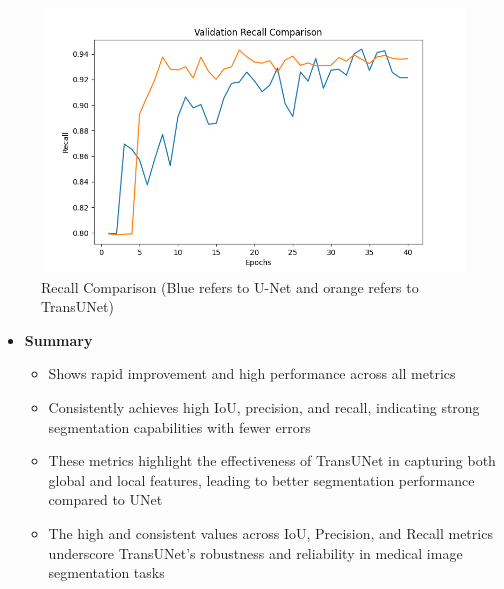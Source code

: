 \documentclass[11pt,a4paper]{article}
\begin{document}
\begin{figure}[H]
    \centering
    \includegraphics[width= 0.9\linewidth]{recall.png}
    \caption{Recall Comparison (Blue refers to U-Net and orange refers to TransUNet)}
\end{figure}
\vspace{0.9cm}
\begin{itemize}
    \item \textbf{Summary}
    \begin{itemize}
        \item Shows rapid improvement and high performance across all metrics
        \item Consistently achieves high IoU, precision, and recall, indicating strong segmentation capabilities with fewer errors
        \item These metrics highlight the effectiveness of TransUNet in capturing both global and local features, leading to better segmentation performance compared to UNet
        \item The high and consistent values across IoU, Precision, and Recall metrics underscore TransUNet's robustness and reliability in medical image segmentation tasks
    \end{itemize}
\end{itemize}
\vspace{8.9cm}
\end{document}

